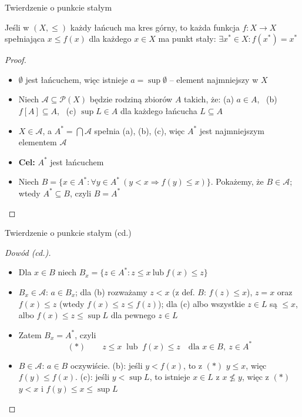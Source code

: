 \documentclass[aspectratio=169,11pt,t,envcountsect,professionalfonts]{beamer}
\begin{document}
\begin{frame}{Twierdzenie o punkcie stałym}
\begin{mythm}
    Jeśli w $(X, \leqslant)$ każdy łańcuch ma kres górny, to każda funkcja $f: X \to X$ spełniająca $x \leqslant f(x)$ dla każdego $x \in X$ ma punkt stały: $\exists x^* \in X: f(x^*) = x^*$
\end{mythm}
\begin{proof}
    \begin{itemize}
        \item $\emptyset$ jest łańcuchem, więc istnieje $a = \sup \emptyset$ -- element najmniejszy w $X$
        \item Niech $\mathcal{A} \subseteq \mathcal{P}(X)$ będzie rodziną zbiorów $A$ takich, że: (a) $a \in A$, \ (b) $f[A] \subseteq A$, \ (c) $\sup L \in A$ dla każdego łańcucha $L \subseteq A$
        \item $X \in \mathcal{A}$, a $A^* = \bigcap \mathcal{A}$ spełnia (a), (b), (c), więc $A^*$ jest najmniejszym elementem $\mathcal{A}$
        \item \textbf{Cel:} $A^*$ jest łańcuchem
        \item Niech $B = \{x \in A^* : \forall y \in A^*\ (y < x \Rightarrow f(y) \leqslant x)\}$. Pokażemy, że $B \in \mathcal{A}$; wtedy $A^* \subseteq B$, czyli $B = A^*$
    \end{itemize}
\end{proof}
\end{frame}

\begin{frame}{Twierdzenie o punkcie stałym (cd.)}
\begin{proof}[Dowód (cd.)]
    \begin{itemize}
        \item Dla $x \in B$ niech $B_x = \{z \in A^* : z \leqslant x \ \text{lub} \ f(x) \leqslant z\}$
        \item $B_x \in \mathcal{A}$: $a \in B_x$; dla (b) rozważamy $z < x$ (z def. $B$: $f(z) \leqslant x$), $z = x$ oraz $f(x) \leqslant z$ (wtedy $f(x) \leqslant z \leqslant f(z)$); dla (c) albo wszystkie $z \in L$ są $\leqslant x$, albo $f(x) \leqslant z \leqslant \sup L$ dla pewnego $z \in L$
        \item Zatem $B_x = A^*$, czyli
        $$(\ast)\qquad z \leqslant x \ \text{ lub } \ f(x) \leqslant z \quad \text{dla } x \in B,\ z \in A^*$$
        \item $B \in \mathcal{A}$: $a \in B$ oczywiście. (b): jeśli $y < f(x)$, to z $(\ast)$ $y \leqslant x$, więc $f(y) \leqslant f(x)$. (c): jeśli $y < \sup L$, to istnieje $x \in L$ z $x \nleqslant y$, więc z $(\ast)$ $y < x$ i $f(y) \leqslant x \leqslant \sup L$
    \end{itemize}
\end{proof}
\end{frame}
\end{document}
